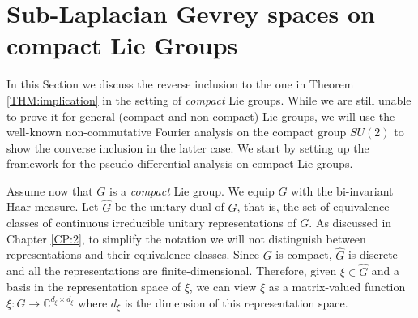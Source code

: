 \documentclass[12pt,oneside,a4paper]{book}
\numberwithin{equation}{section}     %
\theoremstyle{plain}
\theoremstyle{definition}
\newcommand{\C}{{\mathbb C}}
\newcommand{\Gh}{{\widehat{G}}}
\begin{document}
\section{Sub-Laplacian Gevrey spaces on compact Lie Groups}
\label{SEC:cpt-groups}

In this Section we discuss the reverse inclusion to the one in Theorem \ref{THM:implication} in the setting of \textit{compact} Lie groups. While we are still unable to prove it for general (compact and non-compact) Lie groups, we will use the well-known non-commutative Fourier analysis on the compact group $SU(2)$ to show the converse inclusion in the latter case. We start by setting up the framework for the pseudo-differential analysis on compact Lie groups.

\medskip
Assume now that $G$ is a \textit{compact} Lie group. We equip $G$ with the bi-invariant Haar measure. 
Let $\Gh$ be the unitary dual of $G$, that is, the set of equivalence classes of continuous irreducible unitary representations of $G$. As discussed in Chapter \ref{CP:2}, to simplify the notation we will not distinguish between representations and their equivalence classes. Since $G$ is compact, $\Gh$ is discrete and all the representations are finite-dimensional. Therefore, given $\xi\in\Gh$ and a basis in the representation space of $\xi$, we can view $\xi$ as a matrix-valued function $\xi:G\rightarrow \C^{d_\xi\times d_\xi}$ where $d_\xi$ is the dimension of this representation space.
\end{document}
